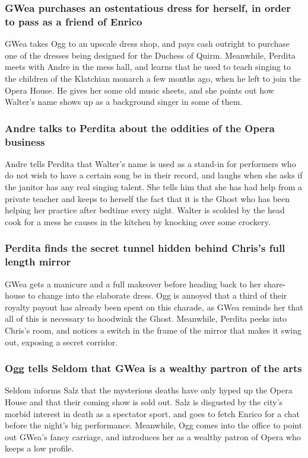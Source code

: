 \subsubsection{\Gls{GWea} purchases an ostentatious dress for herself, in order to pass as a
    friend of \Gls{Enrico}}
\Gls{GWea} takes \Gls{Ogg} to an upscale dress shop, and pays cash outright to purchase one of the
dresses being designed for the Duchess of Quirm. Meanwhile, \Gls{Perdita} meets with \Gls{Andre} in
the mess hall, and learns that he used to teach singing to the children of the Klatchian monarch
a few months ago, when he left to join the Opera House. He gives her some old music sheets, and she
points out how \Gls{Walter}'s name shows up as a background singer in some of them.

\subsubsection{\Gls{Andre} talks to \Gls{Perdita} about the oddities of the Opera business}
\Gls{Andre} tells \Gls{Perdita} that \Gls{Walter}'s name is used as a stand-in for performers who do
not wish to have a certain song be in their record, and laughs when she asks if the janitor has any
real singing talent. She tells him that she has had help from a private teacher and keeps to herself
the fact that it is the \Gls{Ghost} who has been helping her practice after bedtime every night.
\Gls{Walter} is scolded by the head cook for a mess he causes in the kitchen by knocking over
some crockery.

\subsubsection{\Gls{Perdita} finds the secret tunnel hidden behind \Gls{Chris}'s full length mirror}
\Gls{GWea} gets a manicure and a full makeover before heading back to her share-house to change into
the elaborate dress. \Gls{Ogg} is annoyed that a third of their royalty payout has already been
spent on this charade, as \Gls{GWea} reminds her that all of this is necessary to hoodwink the
\Gls{Ghost}. Meanwhile, \Gls{Perdita} peeks into \Gls{Chris}'s room, and notices a switch in the
frame of the mirror that makes it swing out, exposing a secret corridor.

\subsubsection{\Gls{Ogg} tells \Gls{Seldom} that \Gls{GWea} is a wealthy partron of the arts}
\Gls{Seldom} informs \Gls{Salz} that the mysterious deaths have only hyped up the Opera House and
that their coming show is sold out. \Gls{Salz} is disgusted by the city's morbid interest in death
as a spectator sport, and goes to fetch \Gls{Enrico} for a chat before the night's big performance.
Meanwhile, \Gls{Ogg} comes into the office to point out \Gls{GWea}'s fancy carriage, and introduces
her as a wealthy patron of Opera who keeps a low profile.

